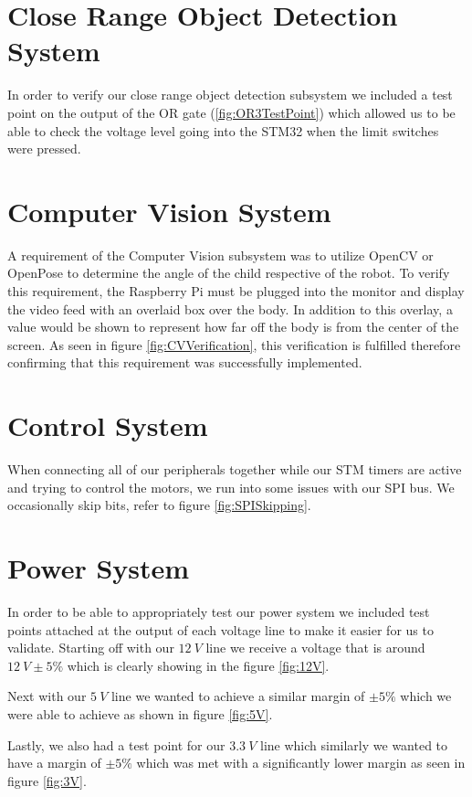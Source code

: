\documentclass{report}
\begin{document}
    \section{Close Range Object Detection System}
    In order to verify our close range object detection subsystem we included a test point on the output of the OR gate (\ref{fig:OR3TestPoint}) which allowed us to be able to check the voltage level going into the STM32 when the limit switches were pressed.
    
    \section{Computer Vision System}
    A requirement of the Computer Vision subsystem was to utilize OpenCV or OpenPose to determine the angle of the child respective of the robot. To verify this requirement, the Raspberry Pi must be plugged into the monitor and display the video feed with an overlaid box over the body. In addition to this overlay, a value would be shown to represent how far off the body is from the center of the screen. As seen in figure \ref{fig:CVVerification}, this verification is fulfilled therefore confirming that this requirement was successfully implemented.
    
    \section{Control System}
    When connecting all of our peripherals together while our STM timers are active and trying to control the motors, we run into some issues with our SPI bus. We occasionally skip bits, refer to figure \ref{fig:SPISkipping}.
    
    \section{Power System}
    In order to be able to appropriately test our power system we included test points attached at the output of each voltage line to make it easier for us to validate. Starting off with our $12~V$ line we receive a voltage that is around $12~V \pm 5\%$ which is clearly showing in the figure \ref{fig:12V}. 
    
    Next with our $5~V$ line we wanted to achieve a similar margin of $\pm 5\%$ which we were able to achieve as shown in figure \ref{fig:5V}.

    Lastly, we also had a test point for our $3.3~V$ line which similarly we wanted to have a margin of $\pm 5\%$ which was met with a significantly lower margin as seen in figure \ref{fig:3V}.
\end{document}
